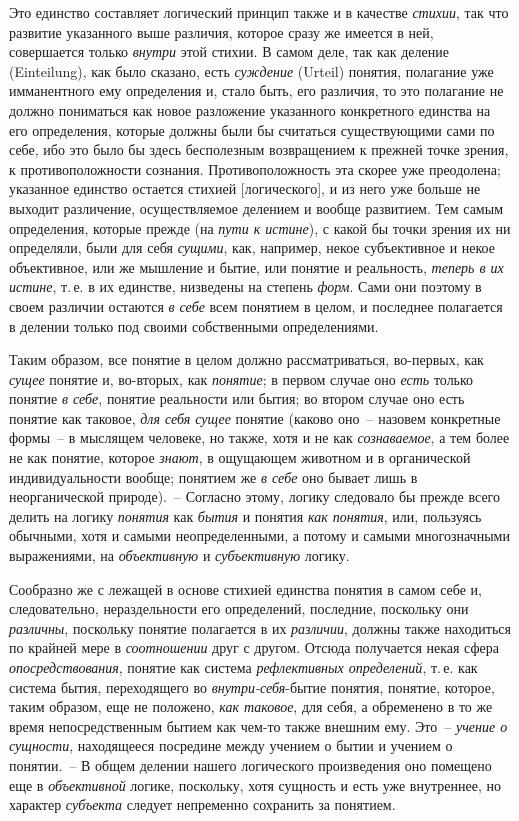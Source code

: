 Это единство составляет логический принцип также
и в качестве \emph{стихии}, так что развитие указанного выше
различия, которое сразу же имеется в ней, совершается
только \emph{внутри} этой стихии. В самом деле, так как деление
(Einteilung), как было сказано, есть \emph{суждение}
(Urteil) понятия, полагание уже имманентного ему определения
и, стало быть, его различия, то это полагание
не должно пониматься как новое разложение указанного
конкретного единства на его определения, которые
должны были бы считаться существующими сами по
себе, ибо это было бы здесь бесполезным возвращением
к прежней точке зрения, к противоположности сознания.
Противоположность эта скорее уже преодолена; указанное
единство остается стихией [логического], и из него
уже больше не выходит различение, осуществляемое делением
и вообще развитием. Тем самым определения,
которые прежде (на \emph{пути к истине}), с какой бы точки
зрения их ни определяли, были для себя \emph{сущими}, как,
например, некое субъективное и некое объективное, или
же мышление и бытие, или понятие и реальность, \emph{теперь
в их истине}, т.\,е. в их единстве, низведены на степень
\emph{форм}. Сами они поэтому в своем различии остаются
\emph{в себе} всем понятием в целом, и последнее полагается в делении
только под своими собственными определениями.

Таким образом, все понятие в целом должно рассматриваться,
во-первых, как \emph{сущее} понятие и, во-вторых,
как \emph{понятие}; в первом случае оно \emph{есть} только понятие
\emph{в себе}, понятие реальности или бытия; во втором случае
оно есть понятие как таковое, \emph{для себя сущее} понятие
(каково оно~-- назовем конкретные формы~-- в мыслящем
человеке, но также, хотя и не как \emph{сознаваемое}, а тем
более не как понятие, которое \emph{знают}, в ощущающем животном
и в органической индивидуальности вообще; понятием
же \emph{в себе} оно бывает лишь в неорганической
природе).~-- Согласно этому, логику следовало бы прежде
всего делить на логику \emph{понятия} как \emph{бытия} и понятия
\emph{как понятия}, или, пользуясь обычными, хотя и самыми
неопределенными, а потому и самыми многозначными
выражениями, на \emph{объективную} и \emph{субъективную} логику.

Сообразно же с лежащей в основе стихией единства
понятия в самом себе и, следовательно, нераздельности
его определений, последние, поскольку они \emph{различны},
поскольку понятие полагается в их \emph{различии}, должны
также находиться по крайней мере в \emph{соотношении} друг
с другом. Отсюда получается некая сфера \emph{опосредствования},
понятие как система \emph{рефлективных определений},
т.\,е. как система бытия, переходящего во \emph{внутри-себя}-бытие
понятия, понятие, которое, таким образом, еще не
положено, \emph{как таковое}, для себя, а обременено в то же
время непосредственным бытием как чем-то также внешним
ему. Это~-- \emph{учение о сущности}, находящееся посредине
между учением о бытии и учением о понятии.~--
В общем делении нашего логического произведения оно
помещено еще в \emph{объективной} логике, поскольку, хотя
сущность и есть уже внутреннее, но характер \emph{субъекта}
следует непременно сохранить за понятием.

